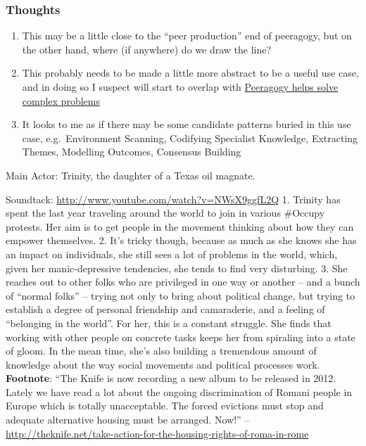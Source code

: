 \subsubsection{Thoughts}

\begin{enumerate}
\item
  This may be a little close to the ``peer production'' end of
  peeragogy, but on the other hand, where (if anywhere) do we draw the
  line?
\item
  This probably needs to be made a little more abstract to be a useful
  use case, and in doing so I suspect will start to overlap with
  \href{http://metameso.org/peeragogy/patterns-usecases/use-cases/peeragogy-helps-solve-complex-problems/}{Peeragogy
  helps solve complex problems}
\item
  It looks to me as if there may be some candidate patterns buried in
  this use case, e.g.~Environment Scanning, Codifying Specialist
  Knowledge, Extracting Themes, Modelling Outcomes, Consensus Building
\end{enumerate}
Main Actor: Trinity, the daughter of a Texas oil magnate.

Soundtack:
\href{http://www.youtube.com/watch?v=NWsX9ggfL2Q}{http://www.youtube.com/watch?v=NWsX9ggfL2Q}
1. Trinity has spent the last year traveling around the world to join in
various \#Occupy protests. Her aim is to get people in the movement
thinking about how they can empower themselves. 2. It's tricky though,
because as much as she knows she has an impact on individuals, she still
sees a lot of problems in the world, which, given her manic-depressive
tendencies, she tends to find very disturbing. 3. She reaches out to
other folks who are privileged in one way or another -- and a bunch of
``normal folks'' -- trying not only to bring about political change, but
trying to establish a degree of personal friendship and camaraderie, and
a feeling of ``belonging in the world''. For her, this is a constant
struggle. She finds that working with other people on concrete tasks
keeps her from spiraling into a state of gloom. In the mean time, she's
also building a tremendous amount of knowledge about the way social
movements and political processes work. \textbf{Footnote}: ``The Knife
is now recording a new album to be released in 2012. Lately we have read
a lot about the ongoing discrimination of Romani people in Europe which
is totally unacceptable. The forced evictions must stop and adequate
alternative housing must be arranged. Now!'' --
\href{http://theknife.net/take-action-for-the-housing-rights-of-roma-in-rome}{http://theknife.net/take-action-for-the-housing-rights-of-roma-in-rome}

